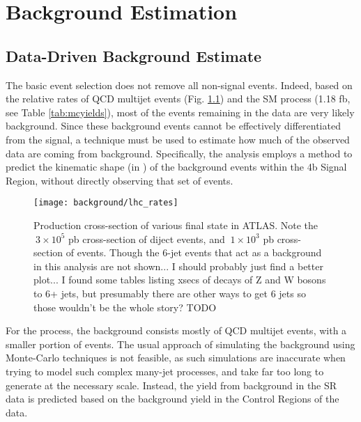\chapter{Background Estimation} \label{chapter:background}

\FloatBarrier
\section{Data-Driven Background Estimate}

    The basic event selection does not remove all non-signal events.
    Indeed, based on the relative rates of QCD multijet events (Fig. \ref{fig:lhc_rates}) and the SM \vbfhhproc process (1.18 fb, see Table \ref{tab:mcyields}),
        most of the events remaining in the data are very likely background.
    Since these background events cannot be effectively differentiated from the signal,
        a technique must be used to estimate how much of the observed data are coming from background.
    Specifically, the analysis employs a method to predict the kinematic shape (in \mhh)
        of the background events within the 4b Signal Region,
        without directly observing that set of events.

    \begin{figure}[tbh]
        \texttt{[image: background/lhc\_rates]}
        \caption{
            Production cross-section of various final state in ATLAS\cite{atlas_sm_summary}.
            Note the $~3 \times 10^5$ pb cross-section of diject events,
                and $~1 \times 10^3$ pb cross-section of \ttbar events.
            Though the 6-jet events that act as a background in this analysis are not shown...
                I should probably just find a better plot...
                I found some tables listing xsecs of decays of Z and W bosons to 6+ jets,
                but presumably there are other ways to get 6 jets so those wouldn't be the whole story? TODO
        }
        \label{fig:lhc_rates}
    \end{figure}

    For the \vbfproc process, the background consists mostly of QCD multijet events,
        with a smaller portion of \ttbar events.
    The usual approach of simulating the background using Monte-Carlo techniques is not feasible,
        as such simulations are inaccurate when trying to model such complex many-jet processes,
        and take far too long to generate at the necessary scale.
    Instead, the yield from background in the SR data is predicted based on the background yield in the Control Regions of the data.
        
